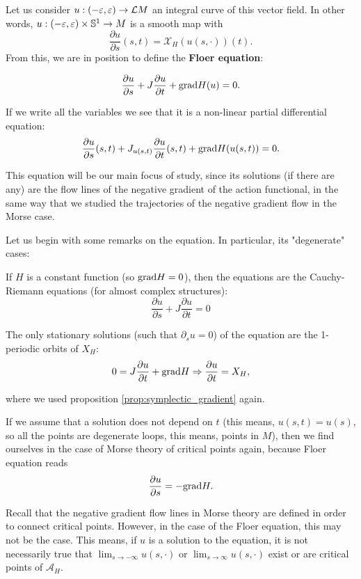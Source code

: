 Let us consider $u : (-\varepsilon,\varepsilon) \rightarrow \mathcal{L}M$ an integral curve of this vector field. In other words, $u : (-\varepsilon,\varepsilon) \times \mathbb{S}^1 \rightarrow M$ is a smooth map with
$$\frac{\partial u}{\partial s} (s,t) = \mathcal{X}_H(u(s,\cdot)) (t) .$$
From this, we are in position to define the {\bf Floer equation}:

\begin{equation} \label{equation:floer_equation}
\frac{\partial u}{\partial s} + J \frac{\partial u}{\partial t} + \mathrm{grad} H(u) = 0 .
\end{equation}

If we write all the variables we see that it is a non-linear partial differential equation:
$$\frac{\partial u}{\partial s}(s,t) + J_{u(s,t)} \frac{\partial u}{\partial t}(s,t) + \mathrm{grad} H(u(s,t)) = 0 .$$

This equation will be our main focus of study, since its solutions (if there are any) are the flow lines of the negative gradient of the action functional, in the same way that we studied the trajectories of the negative gradient flow in the Morse case.

Let us begin with some remarks on the equation. In particular, its "degenerate" cases:

\begin{rmrk}
If $H$ is a constant function (so $\mathrm{grad} H = 0$), then the equations are the Cauchy-Riemann equations (for almost complex structures):
$$\frac{\partial u}{\partial s} + J \frac{\partial u}{\partial t} = 0$$
\end{rmrk}

\begin{rmrk}
The only stationary solutions (such that $\partial_s u = 0$) of the equation are the 1-periodic orbits of $X_H$:
$$0 = J \frac{\partial u}{\partial t} + \mathrm{grad} H \Rightarrow \frac{\partial u}{\partial t} = X_H ,$$

where we used proposition \ref{prop:symplectic_gradient} again.
\end{rmrk}

\begin{rmrk}
If we assume that a solution does not depend on $t$ (this means, $u(s,t) = u(s)$, so all the points are degenerate loops, this means, points in $M$), then we find ourselves in the case of Morse theory of critical points again, because Floer equation reads
$$\frac{\partial u}{\partial s} = - \mathrm{grad} H .$$
\end{rmrk}

Recall that the negative gradient flow lines in Morse theory are defined in order to connect critical points. However, in the case of the Floer equation, this may not be the case. This means, if $u$ is a solution to the equation, it is not necessarily true that $\displaystyle\lim_{s \rightarrow -\infty} u(s,\cdot)$ or $\displaystyle\lim_{s \rightarrow \infty} u(s,\cdot)$ exist or are critical points of $\mathcal{A}_H$.

